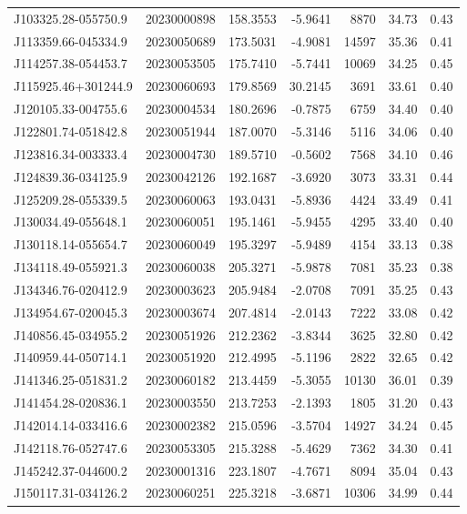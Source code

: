 \documentclass{article}
\begin{document}
\begin {longtable}{|l|l|r|r|r|r|r|}
 J103325.28-055750.9&  20230000898&  158.3553&   -5.9641&  8870& 34.73& 0.43\\ 
 J113359.66-045334.9&  20230050689&  173.5031&   -4.9081& 14597& 35.36& 0.41\\
 J114257.38-054453.7&  20230053505&  175.7410&   -5.7441& 10069& 34.25& 0.45\\
 J115925.46+301244.9&  20230060693&  179.8569&   30.2145&  3691& 33.61& 0.40\\
 J120105.33-004755.6&  20230004534&  180.2696&   -0.7875&  6759& 34.40& 0.40\\
 J122801.74-051842.8&  20230051944&  187.0070&   -5.3146&  5116& 34.06& 0.40\\
 J123816.34-003333.4&  20230004730&  189.5710&   -0.5602&  7568& 34.10& 0.46\\
 J124839.36-034125.9&  20230042126&  192.1687&   -3.6920&  3073& 33.31& 0.44\\
 J125209.28-055339.5&  20230060063&  193.0431&   -5.8936&  4424& 33.49& 0.41\\
 J130034.49-055648.1&  20230060051&  195.1461&   -5.9455&  4295& 33.40& 0.40\\
 J130118.14-055654.7&  20230060049&  195.3297&   -5.9489&  4154& 33.13& 0.38\\
 J134118.49-055921.3&  20230060038&  205.3271&   -5.9878&  7081& 35.23& 0.38\\
 J134346.76-020412.9&  20230003623&  205.9484&   -2.0708&  7091& 35.25& 0.43\\
 J134954.67-020045.3&  20230003674&  207.4814&   -2.0143&  7222& 33.08& 0.42\\
 J140856.45-034955.2&  20230051926&  212.2362&   -3.8344&  3625& 32.80& 0.42\\
 J140959.44-050714.1&  20230051920&  212.4995&   -5.1196&  2822& 32.65& 0.42\\
 J141346.25-051831.2&  20230060182&  213.4459&   -5.3055& 10130& 36.01& 0.39\\
 J141454.28-020836.1&  20230003550&  213.7253&   -2.1393&  1805& 31.20& 0.43\\
 J142014.14-033416.6&  20230002382&  215.0596&   -3.5704& 14927& 34.24& 0.45\\
 J142118.76-052747.6&  20230053305&  215.3288&   -5.4629&  7362& 34.30& 0.41\\
 J145242.37-044600.2&  20230001316&  223.1807&   -4.7671&  8094& 35.04& 0.43\\
 J150117.31-034126.2&  20230060251&  225.3218&   -3.6871& 10306& 34.99& 0.44\\

\end{longtable}
\end{document}
